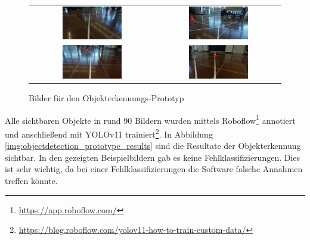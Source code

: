 \documentclass[../main.tex]{subfiles}
\begin{document}
\begin{figure}[H]
\begin{center}
\begin{tabular}{cc}
    \includegraphics[width=0.5\textwidth]{img/prototyping/objekterkennung/Bild1.jpg} &
    \includegraphics[width=0.5\textwidth]{img/prototyping/objekterkennung/Bild2.jpg} \\
    \includegraphics[width=0.5\textwidth]{img/prototyping/objekterkennung/Bild3.jpg} &
    \includegraphics[width=0.5\textwidth]{img/prototyping/objekterkennung/Bild4.jpg}
\end{tabular}
\caption{Bilder für den Objekterkennungs-Prototyp}
\label{img:objectdetection_prototype_images}
\end{center}
\end{figure}

Alle sichtbaren Objekte in rund 90 Bildern wurden mittels Roboflow\footnote{\url{https://app.roboflow.com/}} annotiert und anschließend mit YOLOv11 trainiert\footnote{\url{https://blog.roboflow.com/yolov11-how-to-train-custom-data/}}.  
In Abbildung \ref{img:objectdetection_prototype_results} sind die Resultate der Objekterkennung sichtbar. In den gezeigten Beispielbildern gab es keine Fehlklassifizierungen. Dies ist sehr wichtig, da bei einer Fehlklassifizierungen die Software falsche Annahmen treffen könnte.
\end{document}
